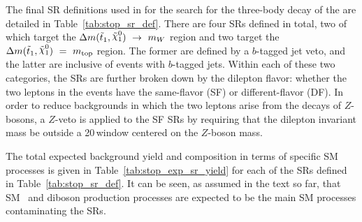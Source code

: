 The final SR definitions used in for the search for the three-body decay of the \stopone
are detailed in Table~\ref{tab:stop_sr_def}.
There are four SRs defined in total, two of which target the $\sdiff~\rightarrow~m_W$ region
and two target the $\sdiff~=~m_{\text{top}}$ region.
The former are defined by a $b$-tagged jet veto, and the latter are inclusive of
events with $b$-tagged jets.
Within each of these two categories, the SRs are further broken down by the dilepton flavor:
whether the two leptons in the events have the same-flavor (SF) or different-flavor (DF).
In order to reduce backgrounds in which the two leptons arise from the decays of $Z$-bosons,
a $Z$-veto is applied to the SF SRs by requiring that the dilepton invariant mass be outside
a 20\,\GeV window centered on the $Z$-boson mass.

The total expected background yield and composition in terms of specific SM processes
is given in Table~\ref{tab:stop_exp_sr_yield} for each of the SRs defined in Table~\ref{tab:stop_sr_def}.
It can be seen, as assumed in the text so far, that SM \ttbar~and diboson production processes
are expected to be the main SM processes contaminating the SRs.

